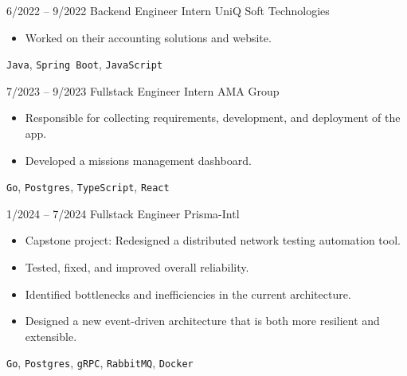 \documentclass[9pt]{developercv} %
\begin{document}
\vspace{-10 pt}
\begin{entrylist}
    \entry
    {6/2022 -- 9/2022}
    {Backend Engineer Intern}
    {UniQ Soft Technologies}
    {\vspace{-10pt}
        \begin{itemize}[noitemsep,topsep=0pt,parsep=0pt,partopsep=0pt,leftmargin=-1pt]
            \item Worked on their accounting solutions and website.
        \end{itemize}
        \texttt{Java}, \texttt{Spring Boot}, \texttt{JavaScript}}
        
    \entry
    {7/2023 -- 9/2023}
    {Fullstack Engineer Intern}
    {AMA Group}
    {\vspace{-10pt}
        \begin{itemize}[noitemsep,topsep=0pt,parsep=0pt,partopsep=0pt,leftmargin=-1pt]
            \item Responsible for collecting requirements, development, and deployment of the app.
            \item Developed a missions management dashboard.
        \end{itemize}
        \texttt{Go}, \texttt{Postgres}, \texttt{TypeScript}, \texttt{React}}
        
    \entry
    {1/2024 -- 7/2024}
    {Fullstack Engineer}
    {Prisma-Intl}
    {\vspace{-10pt}
        \begin{itemize}[noitemsep,topsep=0pt,parsep=0pt,partopsep=0pt,leftmargin=-1pt]
            \item Capstone project: Redesigned a distributed network testing automation tool.
            \item Tested, fixed, and improved overall reliability.
            \item Identified bottlenecks and inefficiencies in the current architecture.
            \item Designed a new event-driven architecture that is both more resilient and extensible.
        \end{itemize}
        \texttt{Go}, \texttt{Postgres}, \texttt{gRPC}, \texttt{RabbitMQ}, \texttt{Docker}}
        

\end{entrylist}
\end{document}
